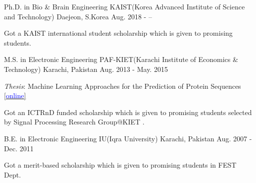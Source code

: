 

\begin{cventries}

  \cventry
    {Ph.D. in Bio \& Brain Engineering} %
    {KAIST(Korea Advanced Institute of Science and Technology)} %
    {Daejeon, S.Korea} %
    {Aug. 2018 - --} %
    {
      \begin{cvitems} %
        \item {Got a KAIST international student scholarship which is given to promising students.}
      \end{cvitems}
    }
    
  \cventry
    {M.S. in Electronic Engineering} %
    {PAF-KIET(Karachi Institute of Economics \& Technology)} %
    {Karachi, Pakistan} %
    {Aug. 2013 - May. 2015} %
    {
      \begin{cvitems} %
      \item {\textit{Thesis}: Machine Learning Approaches for the Prediction of Protein Sequences \href{https://citeseerx.ist.psu.edu/viewdoc/download?doi=10.1.1.1067.8856&rep=rep1&type=pdf}{[\textcolor{blue}{online}]}}
        \item {Got an ICTRnD funded scholarship which is given to promising students selected by Signal Processing Research Group@KIET .}
      \end{cvitems}
    }

  \cventry
    {B.E. in Electronic Engineering} %
    {IU(Iqra University)} %
    {Karachi, Pakistan} %
    {Aug. 2007 - Dec. 2011} %
    {
      \begin{cvitems} %
        \item {Got a merit-based scholarship which is given to promising students in FEST Dept.}
      \end{cvitems}
    }
    
\end{cventries}
